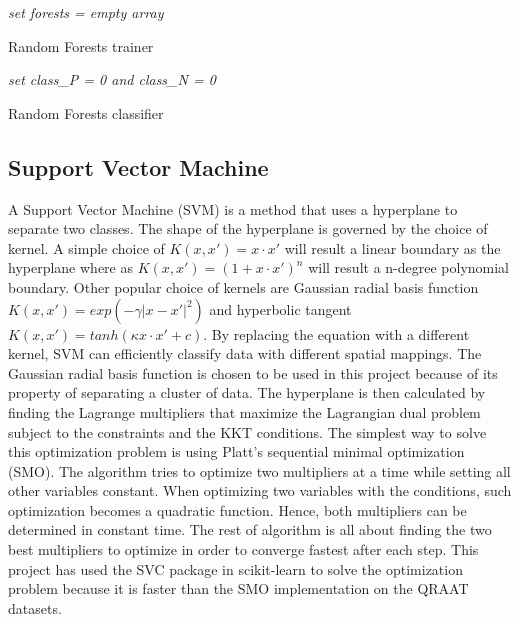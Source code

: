 \documentclass[twoside]{article}
\begin{document}
\IncMargin{1em}
\begin{algorithm}
\BlankLine
\emph{set forests = empty array}\;
\caption{Random Forests trainer}\label{RFt}
\end{algorithm}\DecMargin{1em}

\IncMargin{1em}
\begin{algorithm}
\BlankLine
\emph{set class\_P = 0 and class\_N = 0}\;
\caption{Random Forests classifier}\label{RFc}
\end{algorithm}\DecMargin{1em}

\subsection{Support Vector Machine}
A Support Vector Machine (SVM) is a method that uses a hyperplane to separate two classes. The shape of the hyperplane is governed by the choice of kernel. A simple choice of $K(x,x') = x \cdot x'$ will result a linear boundary as the hyperplane where as $K(x,x') = (1 + x \cdot x')^n$ will result a n-degree polynomial boundary. Other popular choice of kernels are Gaussian radial basis function $K(x,x') = exp(-\gamma |x - x'|^2)$ and hyperbolic tangent $K(x,x') = tanh(\kappa x \cdot x' + c)$. By replacing the equation with a different kernel, SVM can efficiently classify data with different spatial mappings. The Gaussian radial basis function is chosen to be used in this project because of its property of separating a cluster of data. The hyperplane is then calculated by finding the Lagrange multipliers that maximize the Lagrangian dual problem subject to the constraints and the KKT conditions. The simplest way to solve this optimization problem is using Platt's sequential minimal optimization (SMO). The algorithm tries to optimize two multipliers at a time while setting all other variables constant. When optimizing two variables with the conditions, such optimization becomes a quadratic function. Hence, both multipliers can be determined in constant time. The rest of algorithm is all about finding the two best multipliers to optimize in order to converge fastest after each step. This project has used the SVC package in scikit-learn to solve the optimization problem because it is faster than the SMO implementation on the QRAAT datasets.
\end{document}
